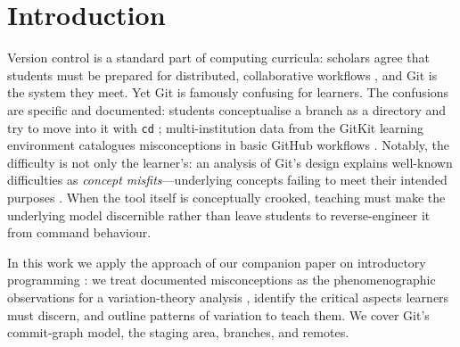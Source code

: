 \mode*
\section{Introduction}

Version control is a standard part of computing curricula: scholars agree
that students must be prepared for distributed, collaborative workflows
\autocite{IsomottonenCochez2014}, and Git is the system they meet.
Yet Git is famously confusing for learners.
The confusions are specific and documented: students conceptualise a branch
as a directory and try to move into it with \texttt{cd}
\autocite{IsomottonenCochez2014}; multi-institution data from the GitKit
learning environment catalogues misconceptions in basic GitHub workflows
\autocite{Postner2026GitMisconceptions}.
Notably, the difficulty is not only the learner's: an analysis of Git's
design explains well-known difficulties as \emph{concept
misfits}---underlying concepts failing to meet their intended purposes
\autocite{DeRossoJackson2016Gitless}.
When the tool itself is conceptually crooked, teaching must make the
underlying model discernible rather than leave students to reverse-engineer
it from command behaviour.


In this work we apply the approach of our companion paper on introductory
programming \autocite{VTProgMisconceptions}: we treat documented
misconceptions as the phenomenographic observations for a variation-theory
analysis \autocite{NCOL}, identify the critical aspects learners must
discern, and outline patterns of variation to teach them.
We cover Git's commit-graph model, the staging area, branches, and remotes.

